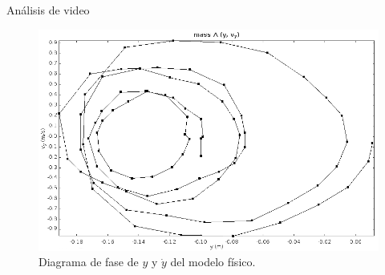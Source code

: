 \documentclass{beamer}
\begin{document}
\begin{frame}{Análisis de video}
 \begin{figure}[h]
 \centering
 \includegraphics[scale=0.2]{../Report/img/tracker_poc_phasediagram_y_vy.png}
 \caption{Diagrama de fase de $y$ y $\dot{y}$ del modelo físico.}
 \label{fig: tracker phase diagram y vy}
\end{figure}

\end{frame}

\begin{frame}{}
 
\end{frame}
\end{document}
